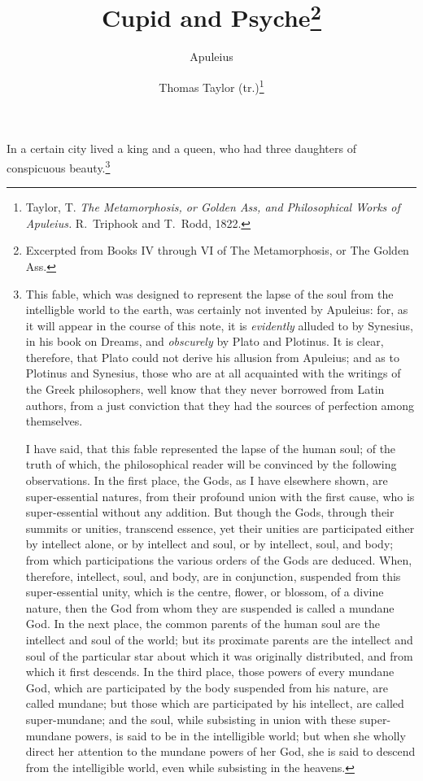\documentclass[12pt]{article}
\title{Cupid and Psyche\footnote{Excerpted from Books IV through VI of The
Metamorphosis, or The Golden Ass.}}
\author{Apuleius \and Thomas Taylor (tr.)\footnote{Taylor, T. \textit{The
Metamorphosis, or Golden Ass, and Philosophical Works of Apuleius.} R.~Triphook
and T.~Rodd, 1822.}} \date{}
\begin{document}
\maketitle

\noindent In a certain city lived a king and a queen, who had three daughters
of conspicuous beauty.\footnote{This fable, which was designed to represent the
lapse of the soul from the intelligble world to the earth, was certainly not
invented by Apuleius: for, as it will appear in the course of this note, it is
\textit{evidently} alluded to by Synesius, in his book on Dreams, and
\textit{obscurely} by Plato and Plotinus. It is clear, therefore, that Plato
could not derive his allusion from Apuleius; and as to Plotinus and Synesius,
those who are at all acquainted with the writings of the Greek philosophers,
well know that they never borrowed from Latin authors, from a just conviction
that they had the sources of perfection among themselves.

I have said, that this fable represented the lapse of the human soul; of the
truth of which, the philosophical reader will be convinced by the following
observations. In the first place, the Gods, as I have elsewhere shown, are
super-essential natures, from their profound union with the first cause, who is
super-essential without any addition. But though the Gods, through their
summits or unities, transcend essence, yet their unities are participated
either by intellect alone, or by intellect and soul, or by intellect, soul, and
body; from which participations the various orders of the Gods are deduced.
When, therefore, intellect, soul, and body, are in conjunction, suspended from
this super-essential unity, which is the centre, flower, or blossom, of a
divine nature, then the God from whom they are suspended is called a mundane
God. In the next place, the common parents of the human soul are the intellect
and soul of the world; but its proximate parents are the intellect and soul of
the particular star about which it was originally distributed, and from which
it first descends. In the third place, those powers of every mundane God, which
are participated by the body suspended from his nature, are called mundane; but
those which are participated by his intellect, are called super-mundane; and
the soul, while subsisting in union with these super-mundane powers, is said to
be in the intelligible world; but when she wholly direct her attention to the
mundane powers of her God, she is said to descend from the intelligible world,
even while subsisting in the heavens.

}
\end{document}

